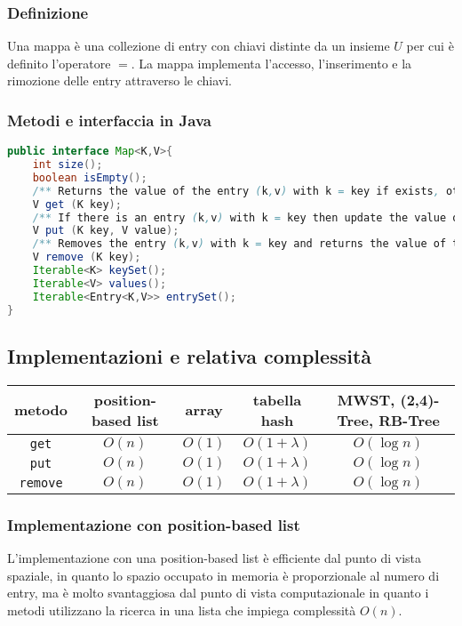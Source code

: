 \documentclass[a4paper]{article}
\begin{document}
\subsubsection*{Definizione}
Una mappa è una collezione di entry con chiavi distinte da un insieme \(U\) per cui è definito l'operatore \(=\). La mappa
implementa l'accesso, l'inserimento e la rimozione delle entry attraverso le chiavi.

\subsubsection*{Metodi e interfaccia in Java}
\begin{lstlisting}[language=Java]
public interface Map<K,V>{
	int size();
	boolean isEmpty();
	/** Returns the value of the entry (k,v) with k = key if exists, otherwise null */
	V get (K key);
	/** If there is an entry (k,v) with k = key then update the value of that entry and returns the old value, otherwise inserts a new entry (key, value) and returns null */
	V put (K key, V value);
	/** Removes the entry (k,v) with k = key and returns the value of the entry, otherwise return null*/
	V remove (K key);
	Iterable<K> keySet();
	Iterable<V> values();
	Iterable<Entry<K,V>> entrySet();
}
\end{lstlisting}

\subsection{Implementazioni e relativa complessità}
\begin{center}
	\begin{tabular}{c | c | c | c | c}
		\textbf{metodo} & \textbf{position-based list} & \textbf{array} & \textbf{tabella hash} & \textbf{MWST, (2,4)-Tree, RB-Tree} \\
		\toprule
		\verb|get| & \(O(n)\) & \(O(1)\) & \(O(1 + \lambda)\) & \(O(\log n)\) \\
		\midrule
		\verb|put| & \(O(n)\) & \(O(1)\) & \(O(1 + \lambda)\) & \(O(\log n)\) \\
		\midrule
		\verb|remove| & \(O(n)\) & \(O(1)\) & \(O(1 + \lambda)\) & \(O(\log n)\) \\
		\bottomrule
	\end{tabular}
\end{center}

\subsubsection*{Implementazione con position-based list}
L'implementazione con una position-based list è efficiente dal punto di vista spaziale, in quanto lo spazio occupato in memoria
è proporzionale al numero di entry, ma è molto svantaggiosa dal punto di vista computazionale in quanto i metodi utilizzano la
ricerca in una lista che impiega complessità \(O(n)\).
\end{document}
